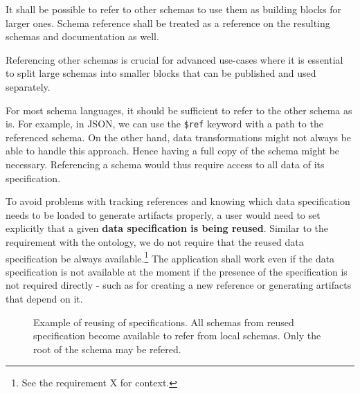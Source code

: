 \begin{requirement}
  It shall be possible to refer to other schemas to use them as building blocks for larger ones. Schema reference shall be treated as a reference on the resulting schemas and documentation as well.
  \label{analysis/requirement/schema-reference}
\end{requirement}

Referencing other schemas is crucial for advanced use-cases where it is essential to split large schemas into smaller blocks that can be published and used separately.

For most schema languages, it should be sufficient to refer to the other schema as is. For example, in JSON, we can use the \verb|$ref| keyword with a path to the referenced schema. On the other hand, data transformations might not always be able to handle this approach. Hence having a full copy of the schema might be necessary. Referencing a schema would thus require access to all data of its specification.

To avoid problems with tracking references and knowing which data specification needs to be loaded to generate artifacts properly, a user would need to set explicitly that a given \textbf{data specification is being reused}. Similar to the requirement with the ontology, we do not require that the reused data specification be always available.\footnote{See the requirement X for context.} The application shall work even if the data specification is not available at the moment if the presence of the specification is not required directly - such as for creating a new reference or generating artifacts that depend on it.

\begin{figure}[h!]\centering
  \caption{Example of reusing of specifications. All schemas from reused specification become available to refer from local schemas. Only the root of the schema may be refered.}
\end{figure}